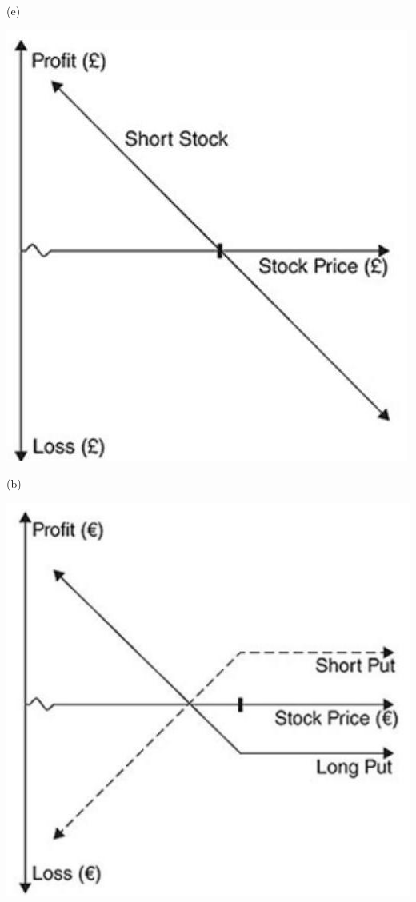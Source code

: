 \documentclass[11pt]{article}
\begin{document}
(e)

\begin{center}
\includegraphics[max width=\textwidth]{2024_04_11_d71a2c9aea882dc3a7b2g-3(3)}
\end{center}

(b)

\begin{center}
\includegraphics[max width=\textwidth]{2024_04_11_d71a2c9aea882dc3a7b2g-3}
\end{center}
\end{document}
